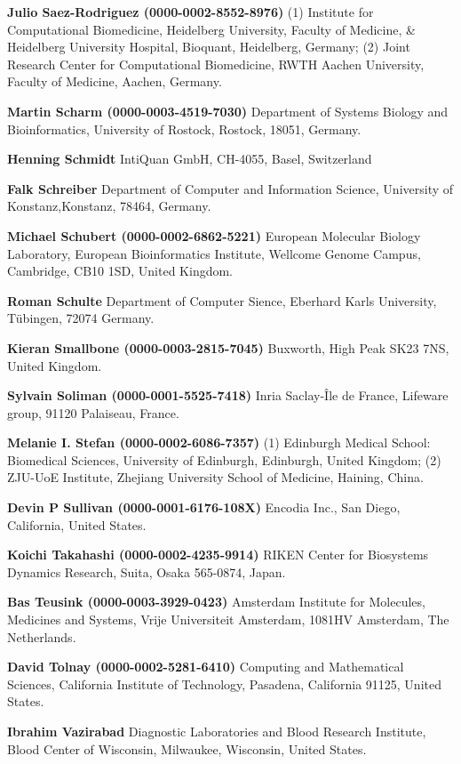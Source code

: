 \documentclass{sbml-paper}
\begin{document}
\textbf{Julio Saez-Rodriguez (0000-0002-8552-8976)} (1) Institute for Computational Biomedicine, Heidelberg University, Faculty of Medicine, \& Heidelberg University Hospital, Bioquant, Heidelberg, Germany; (2) Joint Research Center for Computational Biomedicine, RWTH Aachen University, Faculty of Medicine, Aachen, Germany.

\textbf{Martin Scharm (0000-0003-4519-7030)} Department of Systems Biology and Bioinformatics, University of Rostock, Rostock, 18051, Germany.

\textbf{Henning Schmidt} IntiQuan GmbH, CH-4055, Basel, Switzerland

\textbf{Falk Schreiber} Department of Computer and Information Science, University of Konstanz,Konstanz, 78464, Germany.

\textbf{Michael Schubert (0000-0002-6862-5221)} European Molecular Biology Laboratory, European Bioinformatics Institute, Wellcome Genome Campus, Cambridge, CB10 1SD, United Kingdom.

\textbf{Roman Schulte} Department of Computer Sience, Eberhard Karls University, Tübingen, 72074 Germany.

\textbf{Kieran Smallbone (0000-0003-2815-7045)} Buxworth, High Peak SK23 7NS, United Kingdom.

\textbf{Sylvain Soliman (0000-0001-5525-7418)} Inria Saclay-Île de France, Lifeware group, 91120 Palaiseau, France.

\textbf{Melanie I. Stefan (0000-0002-6086-7357)} (1) Edinburgh Medical School: Biomedical Sciences, University of Edinburgh, Edinburgh, United Kingdom; (2) ZJU-UoE Institute, Zhejiang University School of Medicine, Haining, China.

\textbf{Devin P Sullivan (0000-0001-6176-108X)} Encodia Inc., San Diego, California, United States.

\textbf{Koichi Takahashi (0000-0002-4235-9914)} RIKEN Center for Biosystems Dynamics Research, Suita, Osaka 565-0874, Japan.

\textbf{Bas Teusink (0000-0003-3929-0423)} Amsterdam Institute for Molecules, Medicines and Systems, Vrije Universiteit Amsterdam, 1081HV Amsterdam, The Netherlands.

\textbf{David Tolnay (0000-0002-5281-6410)} Computing and Mathematical Sciences, California Institute of Technology, Pasadena, California 91125, United States.

\textbf{Ibrahim Vazirabad} Diagnostic Laboratories and Blood Research Institute, Blood Center of Wisconsin, Milwaukee, Wisconsin, United States.
\end{document}
